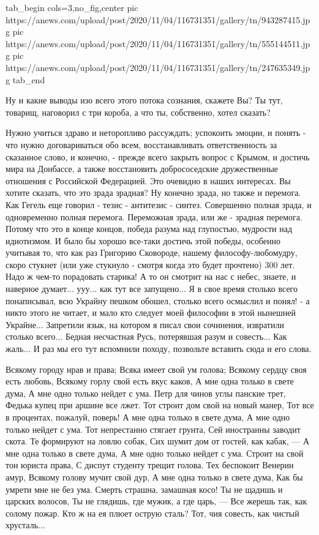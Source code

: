 \ifcmt
  tab_begin cols=3,no_fig,center
     pic https://anews.com/upload/post/2020/11/04/116731351/gallery/tn/943287415.jpg
		 pic https://anews.com/upload/post/2020/11/04/116731351/gallery/tn/555144511.jpg
		 pic https://anews.com/upload/post/2020/11/04/116731351/gallery/tn/247635349.jpg
  tab_end
\fi

Ну и какие выводы изо всего этого потока сознания, скажете Вы? Ты тут, товарищ,
наговорил с три короба, а что ты, собственно, хотел сказать?

Нужно учиться здраво и неторопливо рассуждать; успокоить эмоции, и понять - что
нужно договариваться обо всем, восстанавливать ответственность за сказанное слово, и
конечно, - прежде всего закрыть вопрос с Крымом, и достичь мира на Донбассе, а
также восстановить добрососедские дружественные отношения с Российской
Федерацией. Это очевидно в наших интересах. Вы хотите сказать, что это зрада
зрадная? Ну конечно зрада, но также и перемога. Как Гегель еще говорил - тезис
- антитезис - синтез.  Совершенно полная зрада, и одновременно полная перемога.
Переможная зрада, или же - зрадная перемога. Потому что это в конце концов,
победа разума над глупостью, мудрости над идиотизмом.  И было бы хорошо
все-таки достичь этой победы, особенно учитывая то, что как раз Григорию
Сковороде, нашему философу-любомудру, скоро стукнет (или уже стукнуло - смотря
когда это будет прочтено) 300 лет. Надо ж чем-то порадовать старика! А то он
смотрит на нас с небес, знаете, и наверное думает...  ууу...  как тут все
запущено... Я в свое время столько всего понаписывал, всю Украйну пешком
обошел, столько всего осмыслил и понял! - а никто этого не читает, и мало кто
следует моей философии в этой нынешней Украйне... Запретили язык, на котором я
писал свои сочинения, извратили столько всего... Бедная несчастная Русь,
потерявшая разум и совесть... Как жаль... И раз мы его тут вспомнили походу,
позвольте вставить сюда и его слова.

\raggedcolumns
\begin{multicols}{2} %
\setlength{\parindent}{0pt}
\obeycr
Всякому городу нрав и права;
Всяка имеет свой ум голова;
Всякому сердцу своя есть любовь,
Всякому горлу свой есть вкус каков,
\smallskip
А мне одна только в свете дума,
А мне одно только нейдет с ума.
Петр для чинов углы панские трет,
Федька купец при аршине все лжет.
\smallskip
Тот строит дом свой на новый манер,
Тот все в процентах, пожалуй, поверь!
А мне одна только в свете дума,
А мне одно только нейдет с ума.
\smallskip
Тот непрестанно стягает грунта,
Сей иностранны заводит скота.
Те формируют на ловлю собак,
Сих шумит дом от гостей, как кабак, —
\smallskip
А мне одна только в свете дума,
А мне одно только нейдет с ума.
Строит на свой тон юриста права,
С диспут студенту трещит голова.
\smallskip
Тех беспокоит Венерин амур,
Всякому голову мучит свой дур,
А мне одна только в свете дума,
Как бы умрети мне не без ума.
\smallskip
Смерть страшна, замашная косо!
Ты не щадишь и царских волосов,
Ты не глядишь, где мужик, а где царь, —
Все жерешь так, как солому пожар.
\smallskip
Кто ж на ея плюет острую сталь?
Тот, чия совесть, как чистый хрусталь...
\restorecr
\end{multicols} %

